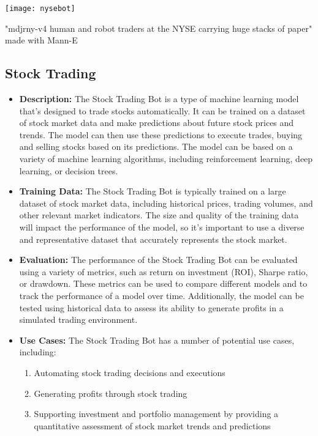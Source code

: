 \begin{pdf}
\begin{marginfigure}[-5.5cm]
        \texttt{[image: nysebot]}
        \caption{"mdjrny-v4 human and robot traders at the NYSE carrying huge stacks of paper" made with Mann-E}
\end{marginfigure}
\end{pdf}

\subsection{Stock Trading}

\begin{itemize}
    \item \textbf{Description:} The Stock Trading Bot is a type of machine learning model that's designed to trade stocks automatically. It can be trained on a dataset of stock market data and make predictions about future stock prices and trends. The model can then use these predictions to execute trades, buying and selling stocks based on its predictions. The model can be based on a variety of machine learning algorithms, including reinforcement learning, deep learning, or decision trees.
    \item \textbf{Training Data:} The Stock Trading Bot is typically trained on a large dataset of stock market data, including historical prices, trading volumes, and other relevant market indicators. The size and quality of the training data will impact the performance of the model, so it's important to use a diverse and representative dataset that accurately represents the stock market.
    \item \textbf{Evaluation:} The performance of the Stock Trading Bot can be evaluated using a variety of metrics, such as return on investment (ROI), Sharpe ratio, or drawdown. These metrics can be used to compare different models and to track the performance of a model over time. Additionally, the model can be tested using historical data to assess its ability to generate profits in a simulated trading environment.
    \item \textbf{Use Cases:} The Stock Trading Bot has a number of potential use cases, including:
        \begin{enumerate}  
            \item Automating stock trading decisions and executions
            \item Generating profits through stock trading
            \item Supporting investment and portfolio management by providing a quantitative assessment of stock market trends and predictions

\end{enumerate}
\end{itemize}
